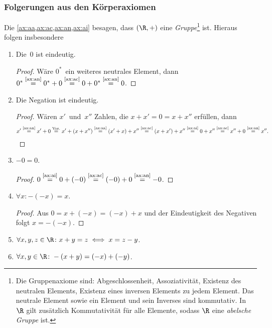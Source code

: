 \documentclass[a4paper]{article}
\begin{document}
\subsubsection{Folgerungen aus den Körperaxiomen}

Die \cref{ax:aa,ax:ac,ax:an,ax:ai} besagen, dass $(\R, +)$ eine \emph{Gruppe}\footnote{Die Gruppenaxiome sind: Abgeschlossenheit, Assoziativität, Existenz des neutralen Elements, Existenz eines inversen Elements zu jedem Element. Das neutrale Element sowie ein Element und sein Inverses sind kommutativ. In~$\R$ gilt zusätzlich Kommutativität für alle Elemente, sodass $\R$ eine \emph{abelsche Gruppe} ist.} ist. Hieraus folgen insbesondere
\begin{enumerate}[label=\textnormal{(\alph*)}, leftmargin=*, widest=(m), series=conclusions]
    \item Die~0 ist eindeutig.
          \begin{proof}
              Wäre $0^*$~ein weiteres neutrales Element, dann $0^* \overset{\text{\ref{ax:an}}}{=} 0^* + 0 \overset{\text{\ref{ax:ac}}}{=} 0 + 0^* \overset{\text{\ref{ax:an}}}{=} 0$.
          \end{proof}
    \item Die Negation ist eindeutig.
          \begin{proof}
              Wären $x'$~und~$x''$ Zahlen, die $x + x' = 0 = x + x''$ erfüllen, dann
              \begin{equation*}
                  x' \overset{\text{\ref{ax:an}}}{=} x' + 0 \overset{\text{Vor.}}{=} x' + (x + x'') \overset{\text{\ref{ax:aa}}}{=} (x' + x) + x'' \overset{\text{\ref{ax:ac}}}{=} (x + x') + x'' \overset{\text{\ref{ax:ai}}}{=} 0 + x'' \overset{\text{\ref{ax:ac}}}{=} x'' + 0 \overset{\text{\ref{ax:an}}}{=} x''.\qedhere
              \end{equation*}
          \end{proof}
    \item $-0 = 0$.
          \begin{proof}
              $0 \overset{\text{\ref{ax:ai}}}{=} 0 + (-0) \overset{\text{\ref{ax:ac}}}{=} (-0) + 0 \overset{\text{\ref{ax:an}}}{=} -0$.
          \end{proof}
    \item $\forall x\colon - (-x) = x$.
          \begin{proof}
              Aus $0 = x + (-x) = (-x) + x$ und der Eindeutigkeit des Negativen folgt $x = - (-x)$.
          \end{proof}
    \item $\forall x, y, z \in \R\colon x + y = z \iff x = z - y$.\label{ax:addequiv}
    \item $\forall x, y \in \R\colon -(x + y) = (-x) + (-y)$.
\end{enumerate}
\end{document}
